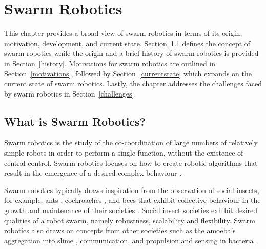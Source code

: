 
\chapter{Swarm Robotics}
\label{chap:first}


This chapter provides a broad view of swarm robotics in terms of its origin, motivation, development, and current state.
Section~\ref{sec:first:definitionswarmrobotics} defines the concept of swarm robotics while the origin and a brief history of swarm robotics is provided in Section~\ref{history}. Motivations for swarm robotics are outlined in Section~\ref{motivations}, followed by Section~\ref{currentstate} which expands on the current state of swarm robotics. Lastly, the chapter addresses the challenges faced by swarm robotics in Section~\ref{challenges}.


\section{What is Swarm Robotics?}
\label{sec:first:definitionswarmrobotics}

Swarm robotics is the study of the co-coordination of large numbers of relatively simple robots in order to perform a single function, without the existence of central control. Swarm robotics focuses on how to create robotic algorithms that result in the emergence of a desired complex behaviour \cite{csahin2005swarm}.

Swarm robotics typically draws inspiration from the observation of social insects, for example, ants \cite{hoff2010two}, cockroaches \cite{garnier2005aggregation}, and bees \cite{lee2012foraging} that exhibit collective behaviour in the growth and maintenance of their societies \cite{wilson1971insect}. Social insect societies exhibit desired qualities of a robot swarm, namely robustness, scalability and flexibility. Swarm robotics also draws on concepts from other societies such as the amoeba's aggregation into slime \cite{schmickl2007navigation}, communication, and propulsion and sensing in bacteria \cite{dhariwal2004bacterium,martel2010using}. 

